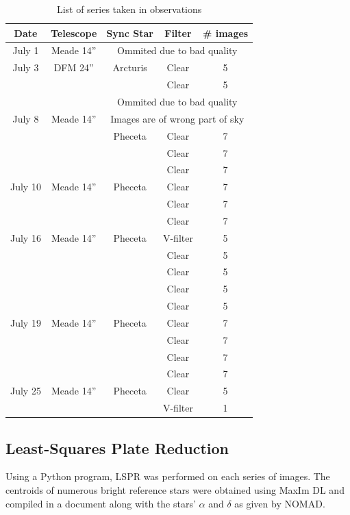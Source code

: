 \documentclass[11pt,a4paper]{article}
\begin{document}
\begin{table}[!t]
\centering
\begin{tabular}{|c|c|c|c|c|}
\hline
Date & Telescope & Sync Star & Filter & \# images \\ \hline \hline
July 1 &Meade 14''& \multicolumn{3}{c|}{Ommited due to bad quality}\\ \hline \hline
July 3 & DFM 24''& Arcturis  & Clear & 5 \\ \cline{4-5}
 & & & Clear & 5\\ \cline{3-5}
 & & \multicolumn{3}{c|}{Ommited due to bad quality} \\ \hline \hline
July 8 &  Meade 14''  &\multicolumn{3}{c|}{Images are of wrong part of sky} \\ \cline{3-5}
 & & Pheceta & Clear & 7 \\ \cline{4-5}
 & & & Clear & 7\\ \cline{4-5}
 & & & Clear & 7\\ \hline \hline
July 10 & Meade 14''& Pheceta  & Clear &7 \\ \cline{4-5}
 & & & Clear & 7\\ \cline{4-5}
 & & & Clear & 7\\ \hline \hline
July 16 & Meade 14''& Pheceta  & V-filter &5 \\ \cline{4-5}
 & & & Clear & 5\\ \cline{4-5}
 & & & Clear & 5\\ \cline{4-5}
 & & & Clear & 5\\ \cline{4-5}
 & & & Clear & 5\\ \hline \hline
July 19 & Meade 14''& Pheceta  & Clear &7 \\ \cline{4-5}
 & & & Clear & 7\\ \cline{4-5}
 & & & Clear & 7\\ \cline{4-5}
 & & & Clear & 7\\ \hline \hline
July 25 & Meade 14'' & Pheceta  & Clear &5 \\ \cline{4-5}
 & & & V-filter & 1\\ \hline 
\end{tabular}
\caption{List of series taken in observations \label{tab:serieslist}}
\end{table}

\subsection{Least-Squares Plate Reduction}
Using a Python program, LSPR was performed on each series of images.
The centroids of numerous bright reference stars were obtained using MaxIm DL and compiled in a document along with the stars' $\alpha$ and $\delta$ as given by NOMAD. 
\end{document}
